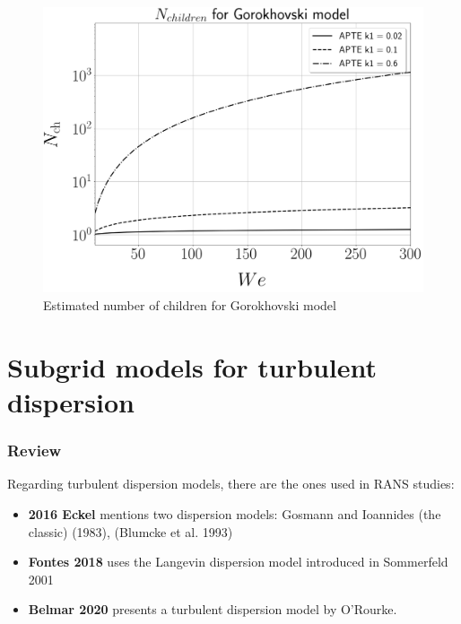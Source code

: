 \begin{figure}[h!]
	\centering
	\includegraphics[scale=0.2]{./part2_developments/figures_ch4_SLI/N_ch_gorok}
	\caption{Estimated number of children for Gorokhovski model}
	\label{fig:N_ch_gorok}
\end{figure}



\section{Subgrid models for turbulent dispersion}

\subsubsection*{Review}

Regarding turbulent dispersion models, there are the ones used in RANS studies:

\begin{itemize}

	\item \textbf{2016 Eckel} mentions two dispersion models: Gosmann and Ioannides (the classic) (1983), (Blumcke et al. 1993)
	
	\item \textbf{Fontes 2018} uses the Langevin dispersion model introduced in Sommerfeld 2001

	\item \textbf{Belmar 2020} presents a turbulent dispersion model by O'Rourke.

\end{itemize}

